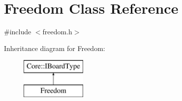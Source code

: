 \hypertarget{class_freedom}{\section{\-Freedom \-Class \-Reference}
\label{class_freedom}
}


{\ttfamily \#include $<$freedom.\-h$>$}

\-Inheritance diagram for \-Freedom\-:\begin{figure}[H]
\begin{center}
\leavevmode
\includegraphics[height=2.000000cm]{class_freedom}
\end{center}
\end{figure}
